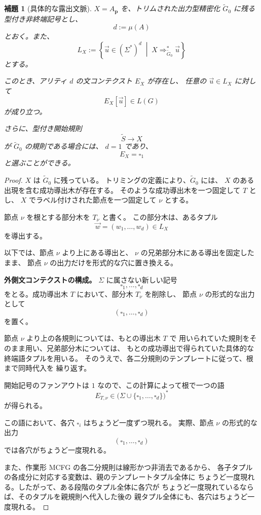 \documentclass[11pt,a4paper]{ltjsarticle}
\newtheorem{lemma}[theorem]{補題}
\theoremstyle{remark}
\newcommand{\tuple}[1]{\vec{#1}}
\newcommand{\blank}{\square}
\begin{document}
\begin{lemma}[具体的な露出文脈]
\label{lem:exposing-contexts}
\(X=A_{\mathbf p}\) を、トリムされた出力型精密化
\(\widetilde G_0\) に残る型付き非終端記号とし、
\[
  d:=\mu(A)
\]
とおく。また、
\[
  L_X
  :=
  \left\{
    \tuple u\in(\Sigma^*)^d
    \;\middle|\;
    X\Rightarrow_{\widetilde G_0}^*\tuple u
  \right\}
\]
とする。

このとき、アリティ \(d\) の文コンテクスト \(E_X\) が存在し、
任意の \(\tuple u\in L_X\) に対して
\[
  E_X[\tuple u]\in L(G)
\]
が成り立つ。

さらに、型付き開始規則
\[
  \widetilde S\to X
\]
が \(\widetilde G_0\) の規則である場合には、
\(d=1\) であり、
\[
  E_X=\blank_1
\]
と選ぶことができる。
\end{lemma}

\begin{proof}
\(X\) は \(\widetilde G_0\) に残っている。
トリミングの定義により、\(\widetilde G_0\) には、
\(X\) のある出現を含む成功導出木が存在する。
そのような成功導出木を一つ固定して \(T\) とし、
\(X\) でラベル付けされた節点を一つ固定して \(\nu\) とする。

節点 \(\nu\) を根とする部分木を \(T_\nu\) と書く。
この部分木は、あるタプル
\[
  \tuple w=(w_1,\ldots,w_d)\in L_X
\]
を導出する。

以下では、節点 \(\nu\) より上にある導出と、
\(\nu\) の兄弟部分木にある導出を固定したまま、
節点 \(\nu\) の出力だけを形式的な穴に置き換える。

\medskip
\noindent
\textbf{外側文コンテクストの構成。}
\(\Sigma\) に属さない新しい記号
\[
  \blank_1,\ldots,\blank_d
\]
をとる。成功導出木 \(T\) において、部分木 \(T_\nu\) を削除し、
節点 \(\nu\) の形式的な出力として
\[
  (\blank_1,\ldots,\blank_d)
\]
を置く。

節点 \(\nu\) より上の各規則については、もとの導出木 \(T\) で
用いられていた規則をそのまま用い、兄弟部分木については、
もとの成功導出で得られていた具体的な終端語タプルを用いる。
そのうえで、各二分規則のテンプレートに従って、根まで同時代入を
繰り返す。

開始記号のファンアウトは \(1\) なので、この計算によって根で一つの語
\[
  E_{T,\nu}
  \in
  \bigl(
    \Sigma\cup\{\blank_1,\ldots,\blank_d\}
  \bigr)^*
\]
が得られる。

この語において、各穴
\(\blank_i\) はちょうど一度ずつ現れる。
実際、節点 \(\nu\) の形式的な出力
\[
  (\blank_1,\ldots,\blank_d)
\]
では各穴がちょうど一度現れる。

また、作業形 MCFG の各二分規則は線形かつ非消去であるから、
各子タプルの各成分に対応する変数は、親のテンプレートタプル全体に
ちょうど一度現れる。したがって、ある段階のタプル全体に各穴が
ちょうど一度現れているならば、そのタプルを親規則へ代入した後の
親タプル全体にも、各穴はちょうど一度現れる。


\end{proof}
\end{document}
